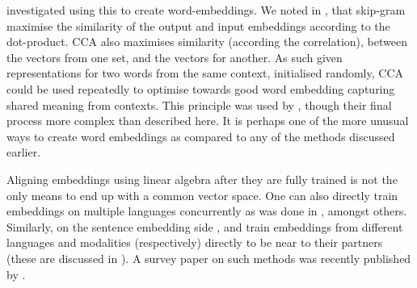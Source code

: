 { investigated using this to create word-embeddings.
We noted in , that skip-gram maximise the similarity of the output and input embeddings according to the dot-product.
CCA also maximises similarity (according the correlation), between the vectors from one set, and the vectors for another.
As such given representations for two words from the same context, initialised randomly,
CCA could be used repeatedly to optimise towards good word embedding capturing shared meaning from contexts.
This principle was used by , though their final process more complex than described here.
It is perhaps one of the more unusual ways to create word embeddings as compared to any of the methods discussed earlier.

Aligning embeddings using linear algebra after they are fully trained is not the only means to end up with a common vector space.
One can also directly train embeddings on multiple languages concurrently as was done in , amongst others.
Similarly, on the sentence embedding side \textcite{zou2013bilingual}, and  train embeddings from different languages and modalities (respectively) directly to be near to their partners (these are discussed in ).
A survey paper on such methods was recently published by .


}
%
